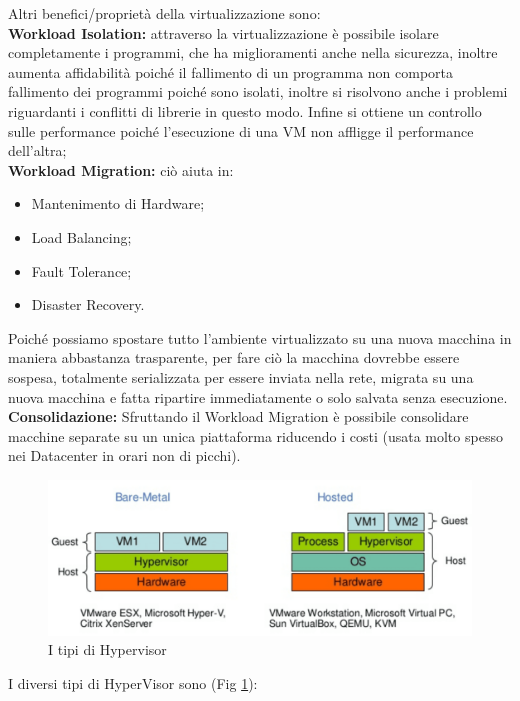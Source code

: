 \documentclass[11pt, twocolumn]{article}
\newenvironment{myitemize}
{ \begin{itemize}[topsep=0ex]
		\setlength{\itemsep}{0pt}
		\setlength{\parskip}{0pt}
		\setlength{\parsep}{0pt}     }
	{ \end{itemize}                  }
\begin{document}
Altri benefici/proprietà della virtualizzazione sono:\\
\textbf{Workload Isolation:} attraverso la virtualizzazione è possibile isolare completamente i programmi, che ha miglioramenti anche nella sicurezza, inoltre aumenta affidabilità poiché il fallimento di un programma non comporta fallimento dei programmi poiché sono isolati, inoltre si risolvono anche i problemi riguardanti i conflitti di librerie in questo modo. Infine si ottiene un controllo sulle performance poiché l'esecuzione di una VM non affligge il performance dell'altra;\\
\textbf{Workload Migration:} ciò aiuta in:
\begin{myitemize}
	\item Mantenimento di Hardware;
	\item Load Balancing;
	\item Fault Tolerance;
	\item Disaster Recovery.
\end{myitemize}
Poiché possiamo spostare tutto l'ambiente virtualizzato su una nuova macchina in maniera abbastanza trasparente, per fare ciò la macchina dovrebbe essere sospesa, totalmente serializzata per essere inviata nella rete, migrata su una nuova macchina e fatta ripartire immediatamente o solo salvata senza esecuzione.\\
\textbf{Consolidazione:} Sfruttando il Workload Migration è possibile consolidare macchine separate su un unica piattaforma riducendo i costi (usata molto spesso nei Datacenter in orari non di picchi).\\
\begin{figure}[h]
	\centering
	\includegraphics[width=\linewidth]{imgs/hypervisor_type.png}
	\caption{I tipi di Hypervisor}
	\label{fig:hypervisor_type}
\end{figure}
I diversi tipi di HyperVisor sono (Fig \ref{fig:hypervisor_type}):
\end{document}
